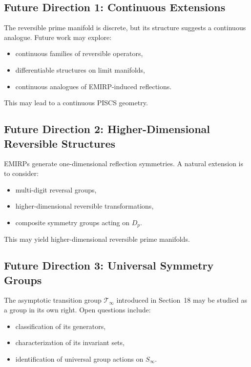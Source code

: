 \documentclass[11pt]{article}
\theoremstyle{definition}
\theoremstyle{plain}
\theoremstyle{remark}
\begin{document}
\subsection{Future Direction 1: Continuous Extensions}

The reversible prime manifold is discrete, but its structure suggests a
continuous analogue. Future work may explore:

\begin{itemize}
    \item continuous families of reversible operators,
    \item differentiable structures on limit manifolds,
    \item continuous analogues of EMIRP-induced reflections.
\end{itemize}

This may lead to a continuous PISCS geometry.

\subsection{Future Direction 2: Higher-Dimensional Reversible Structures}

EMIRPs generate one-dimensional reflection symmetries. A natural
extension is to consider:

\begin{itemize}
    \item multi-digit reversal groups,
    \item higher-dimensional reversible transformations,
    \item composite symmetry groups acting on $D_p$.
\end{itemize}

This may yield higher-dimensional reversible prime manifolds.

\subsection{Future Direction 3: Universal Symmetry Groups}

The asymptotic transition group $\mathcal{T}_\infty$ introduced in
Section~18 may be studied as a group in its own right. Open questions
include:

\begin{itemize}
    \item classification of its generators,
    \item characterization of its invariant sets,
    \item identification of universal group actions on $S_\infty$.
\end{itemize}
\end{document}
